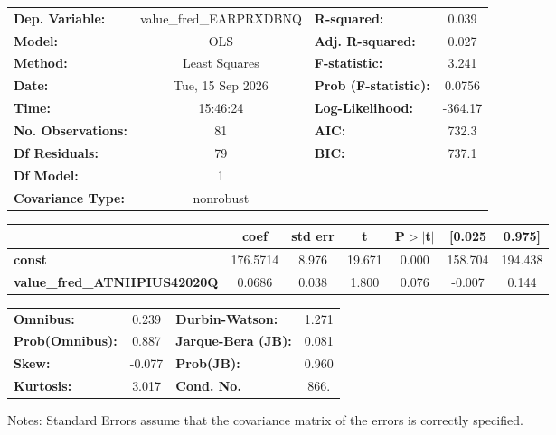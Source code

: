 \begin{center}
\begin{tabular}{lclc}
\toprule
\textbf{Dep. Variable:}              & value\_fred\_EARPRXDBNQ & \textbf{  R-squared:         } &     0.039   \\
\textbf{Model:}                      &           OLS           & \textbf{  Adj. R-squared:    } &     0.027   \\
\textbf{Method:}                     &      Least Squares      & \textbf{  F-statistic:       } &     3.241   \\
\textbf{Date:}                       &     Tue, 15 Sep 2026    & \textbf{  Prob (F-statistic):} &   0.0756    \\
\textbf{Time:}                       &         15:46:24        & \textbf{  Log-Likelihood:    } &   -364.17   \\
\textbf{No. Observations:}           &              81         & \textbf{  AIC:               } &     732.3   \\
\textbf{Df Residuals:}               &              79         & \textbf{  BIC:               } &     737.1   \\
\textbf{Df Model:}                   &               1         & \textbf{                     } &             \\
\textbf{Covariance Type:}            &        nonrobust        & \textbf{                     } &             \\
\bottomrule
\end{tabular}
\begin{tabular}{lcccccc}
                                     & \textbf{coef} & \textbf{std err} & \textbf{t} & \textbf{P$> |$t$|$} & \textbf{[0.025} & \textbf{0.975]}  \\
\midrule
\textbf{const}                       &     176.5714  &        8.976     &    19.671  &         0.000        &      158.704    &      194.438     \\
\textbf{value\_fred\_ATNHPIUS42020Q} &       0.0686  &        0.038     &     1.800  &         0.076        &       -0.007    &        0.144     \\
\bottomrule
\end{tabular}
\begin{tabular}{lclc}
\textbf{Omnibus:}       &  0.239 & \textbf{  Durbin-Watson:     } &    1.271  \\
\textbf{Prob(Omnibus):} &  0.887 & \textbf{  Jarque-Bera (JB):  } &    0.081  \\
\textbf{Skew:}          & -0.077 & \textbf{  Prob(JB):          } &    0.960  \\
\textbf{Kurtosis:}      &  3.017 & \textbf{  Cond. No.          } &     866.  \\
\bottomrule
\end{tabular}
\end{center}

Notes: \newline
 [1] Standard Errors assume that the covariance matrix of the errors is correctly specified.